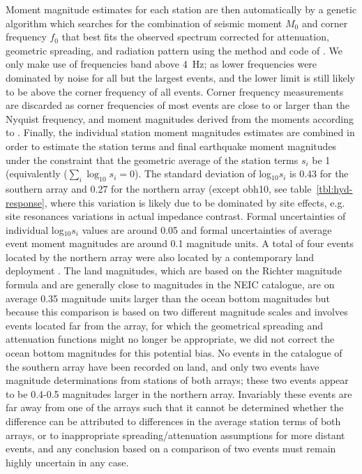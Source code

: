 \documentclass[reviewcopy]{elsart}
\begin{document}
Moment magnitude estimates for each station are
 then automatically by a genetic
 algorithm which searches for the combination of seismic moment $M_0$
 and corner frequency $f_0$ that best
 fits the observed spectrum corrected for attenuation, geometric
 spreading, and radiation pattern using the method and code of
 \citet{ottemoeller03}.
We only make use of frequencies
band above 4~Hz; as lower frequencies were dominated by noise for all
but the largest events, and the
lower limit is still likely to be above the corner frequency of all events.  
Corner frequency measurements
are discarded as corner frequencies of most events are close to or
larger than the Nyquist frequency, and moment magnitudes derived from
the moments according to \citet{kanamori77}.   Finally, the individual station
moment magnitudes estimates are combined in order to estimate the
station terms and final earthquake moment magnitudes under the
constraint that the geometric average of the station terms $s_i$ be
1 (equivalently ($\sum_i \log_{10}s_i=0$).  
The standard deviation of
log$_{10}s_i$ is 0.43 for the southern array and 0.27 for the northern
array (except obh10, see table~\ref{tbl:hyd-response}, where this variation is likely due to be
dominated by site effects, e.g. site resonances variations in actual impedance
contrast. Formal uncertainties of individual log$_{10}s_i$ values are
around 0.05 and formal uncertainties of average event moment
magnitudes are around 0.1 magnitude units. 
A total of four events located by the northern array were also located
by a contemporary land deployment \citep{lange07}.
 The land magnitudes, which are based on the Richter magnitude
formula and are generally close to magnitudes in the NEIC catalogue, are on average 0.35 magnitude units larger
than the ocean bottom magnitudes but because this comparison is based
on two different magnitude scales and involves  events located far
from the array, for which the geometrical 
spreading and attenuation functions might no longer be appropriate, we
did not correct the ocean bottom magnitudes for this potential bias.
No events in the catalogue of the southern array  have been recorded
on land, and only two events have magnitude determinations from
stations of both arrays; these two events appear to be 0.4-0.5
magnitudes larger in the northern array.  Invariably these events are
far away from one of the arrays such that it cannot be determined whether the
difference can be attributed to differences in the average station
terms of both arrays, or to inappropriate spreading/attenuation
assumptions for more distant events, and any conclusion based on a
comparison of two events must remain highly uncertain in any case. 
\end{document}

